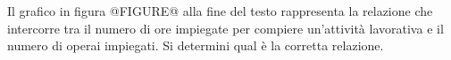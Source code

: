 Il grafico in figura 
@FIGURE@ alla fine del testo
rappresenta la relazione che intercorre tra il numero di ore impiegate per compiere un’attività lavorativa e
il numero di operai impiegati. Si determini qual è la corretta relazione. 